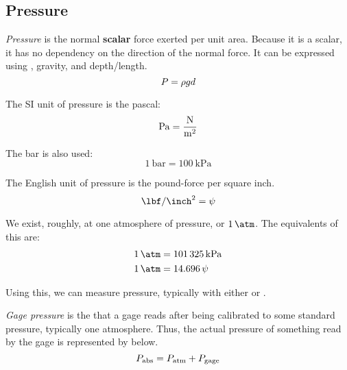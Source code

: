 \subsection{Pressure}\label{subsec:Pressure}
\begin{definition}[Pressure]\label{def:Pressure}
  \emph{Pressure} is the normal \textbf{scalar} force exerted per unit area.
  Because it is a scalar, it has no dependency on the direction of the normal force.
  It can be expressed using , gravity, and depth/length.
  \begin{equation}\label{eq:Pressure}
    P = \rho g d
  \end{equation}

  The SI unit of pressure is the pascal:
  \begin{equation}\label{eq:Pressure_Pascal}
    \si{\pascal} = \si[per-mode=fraction]{\newton\per\meter\squared}
  \end{equation}

  The bar is also used:
  \begin{equation*}
    \SI{1}{\bar} = \SI{100}{\kilo\pascal}
  \end{equation*}

  The English unit of pressure is the pound-force per square inch.
  \begin{equation}\label{eq:Pressure_Bar}
    \si{\lbf\per\inch\squared} = \si{\psi}
  \end{equation}
\end{definition}

We exist, roughly, at one atmosphere of pressure, or $\SI{1}{\atm}$.
The equivalents of this are:
\begin{align*}
  \SI{1}{\atm} &= \SI{101325}{\kilo\pascal} \\
  \SI{1}{\atm} &= \SI{14.696}{\psi}
\end{align*}

Using this, we can measure pressure, typically with either  or .
\begin{definition}\label{def:Gage_Pressure}
  \emph{Gage pressure} is the  that a gage reads after being calibrated to some standard pressure, typically one atmosphere.
  Thus, the actual pressure of something read by the gage is represented by  below.
  \begin{equation}\label{eq:Gage_Pressure}
    P_{\mathrm{abs}} = P_{\mathrm{atm}} + P_{\mathrm{gage}}
  \end{equation}
\end{definition}

